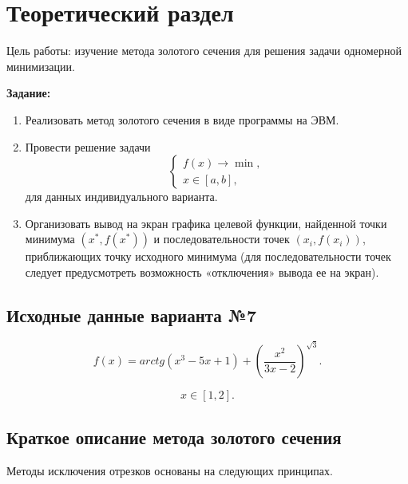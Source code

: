 \chapter{Теоретический раздел}

Цель работы: изучение метода золотого сечения для решения задачи одномерной минимизации.

\textbf{Задание:}
\begin{enumerate}
	\item Реализовать метод золотого сечения в виде программы на ЭВМ.
	\item Провести решение задачи 
	\begin{equation*}
		\begin{cases}
			f(x) \rightarrow \min, \\
			x \in [a, b],
		\end{cases}
	\end{equation*}
	для данных индивидуального варианта.
	\item Организовать вывод на экран графика целевой функции, найденной точки минимума $(x^{*}, f(x^{*}))$ и последовательности точек $(x_i, f(x_i))$, приближающих точку исходного минимума (для последовательности точек следует предусмотреть возможность «отключения» вывода ее на экран).
\end{enumerate}

\section{Исходные данные варианта №7}

\begin{equation*}
	f(x) = arctg(x^3 - 5x + 1) + \left( \frac{x^2}{3x - 2} \right)^{\sqrt{3}}.
\end{equation*}

\begin{equation*}
	x \in [1, 2].
\end{equation*}

\section{Краткое описание метода золотого сечения}

Методы исключения отрезков основаны на следующих принципах.

